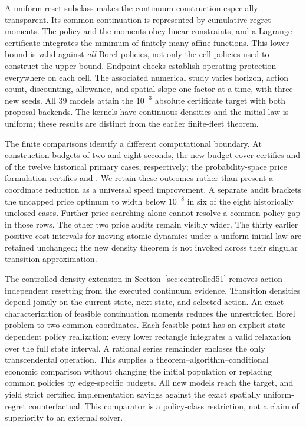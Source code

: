A uniform-reset subclass makes the continuum construction especially transparent. Its common continuation is represented by cumulative regret moments. The policy and the moments obey linear constraints, and a Lagrange certificate integrates the minimum of finitely many affine functions. This lower bound is valid against \emph{all} Borel policies, not only the cell policies used to construct the upper bound. Endpoint checks establish operating protection everywhere on each cell. The associated numerical study varies horizon, action count, discounting, allowance, and spatial slope one factor at a time, with three new seeds. All 39 models attain the $10^{-3}$ absolute certificate target with both proposal backends. The kernels have continuous densities and the initial law is uniform; these results are distinct from the earlier finite-fleet theorem.

The finite comparisons identify a different computational boundary. At construction budgets of two and eight seconds, the new budget cover certifies \RFFBudgetTwo{} and \RFFBudgetEight{} of the twelve historical primary cases, respectively; the probability-space price formulation certifies \RFFPriceTwo{} and \RFFPriceEight{}. We retain these outcomes rather than present a coordinate reduction as a universal speed improvement. A separate audit brackets the uncapped price optimum to width below $10^{-8}$ in six of the eight historically unclosed cases. Further price searching alone cannot resolve a common-policy gap in those rows. The other two price audits remain visibly wider. The thirty earlier positive-cost intervals for moving atomic dynamics under a uniform initial law are retained unchanged; the new density theorem is not invoked across their singular transition approximation.


The controlled-density extension in Section~\ref{sec:controlled51} removes action-independent resetting from the executed continuum evidence. Transition densities depend jointly on the current state, next state, and selected action. An exact characterization of feasible continuation moments reduces the unrestricted Borel problem to two common coordinates. Each feasible point has an explicit state-dependent policy realization; every lower rectangle integrates a valid relaxation over the full state interval. A rational series remainder encloses the only transcendental operation. This supplies a theorem--algorithm--conditional economic comparison without changing the initial population or replacing common policies by edge-specific budgets. All \CRCases{} new models reach the target, and \CRSavings{} yield strict certified implementation savings against the exact spatially uniform-regret counterfactual. This comparator is a policy-class restriction, not a claim of superiority to an external solver.

